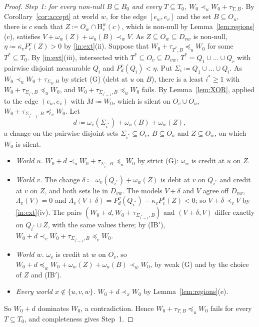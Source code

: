 \documentclass[11pt]{article}
\theoremstyle{definition}\newtheorem{definition}[theorem]{Definition}
\theoremstyle{remark}\newtheorem{remark}[theorem]{Remark}
\newcommand{\Hi}[3]{\mathrm H^{#1}_{#2}(#3)}
\begin{document}
\begin{proof}
\emph{Step 1: for every non-null $B\subseteq B_0$ and every $T\subseteq T_0$,
$W_0\prec_uW_0+\tau_{T,B}$.} By Corollary~\ref{cor:accept} at world $w$,
for the edge $[e_w,e_v]$ and the set $B\subseteq O_u$, there is $c$ such
that $Z\coloneqq O_w\cap\Hi wvc$, which is non-null by
Lemma~\ref{lem:regions}(c), satisfies
$V+\omega_w(Z)+\omega_u(B)\prec_wV$. As $Z\subseteq O_w\subseteq D_{vw}$ is
non-null, $\eta\coloneqq\kappa_vP^v_c(Z)>0$ by \ref{in:ext}(ii). Suppose
that $W_0+\tau_{T^*,B}\preceq_uW_0$ for some $T^*\subseteq T_0$. By
\ref{in:ext}(iii), intersected with $T^*\subseteq O_v\subseteq D_{vw}$,
$T^*=Q_1\cup\dots\cup Q_r$ with pairwise disjoint measurable $Q_i$ and
$P^v_d(Q_i)<\eta$. Put $\Sigma_i\coloneqq Q_1\cup\dots\cup Q_i$. As
$W_0\prec_uW_0+\tau_{\Sigma_0,B}$ by strict (G) (debt at $u$ on $B$), there
is a least $i^*\ge1$ with $W_0+\tau_{\Sigma_{i^*},B}\preceq_uW_0$, and
$W_0+\tau_{\Sigma_{i^*-1},B}\preceq_uW_0$ fails. By Lemma~\ref{lem:XOR},
applied to the edge $(e_u,e_v)$ with $M\coloneqq W_0$, which is silent on
$O_v\cup O_u$, $W_0+\tau_{\Sigma_{i^*-1},B}\preceq_vW_0$. Let
\[
 d\coloneqq\omega_v(\Sigma_{i^*})+\omega_u(B)+\omega_w(Z),
\]
a change on the pairwise disjoint sets $\Sigma_{i^*}\subseteq O_v$,
$B\subseteq O_u$ and $Z\subseteq O_w$, on which $W_0$ is silent.
\begin{itemize}[leftmargin=*,itemsep=2pt]
\item \emph{World $u$.} $W_0+d\prec_uW_0+\tau_{\Sigma_{i^*},B}\preceq_uW_0$
by strict (G): $\omega_w$ is credit at $u$ on $Z$.
\item \emph{World $v$.} The change $\delta\coloneqq\omega_v(Q_{i^*})+
\omega_w(Z)$ is debt at $v$ on $Q_{i^*}$ and credit at $v$ on $Z$, and both
sets lie in $D_{vw}$. The models $V+\delta$ and $V$ agree off $D_{vw}$,
$\Lambda_v(V)=0$ and
$\Lambda_v(V+\delta)=P^v_d(Q_{i^*})-\kappa_vP^v_c(Z)<0$; so
$V+\delta\prec_vV$ by \ref{in:ext}(iv). The pairs
$(W_0+d,W_0+\tau_{\Sigma_{i^*-1},B})$ and $(V+\delta,V)$ differ exactly on
$Q_{i^*}\cup Z$, with the same values there; by (IB$'$),
$W_0+d\prec_vW_0+\tau_{\Sigma_{i^*-1},B}\preceq_vW_0$.
\item \emph{World $w$.} $\omega_v$ is credit at $w$ on $O_v$, so
$W_0+d\preceq_wW_0+\omega_w(Z)+\omega_u(B)\prec_wW_0$, by weak (G) and by
the choice of $Z$ and (IB$'$).
\item \emph{Every world $x\notin\{u,v,w\}$.} $W_0+d\prec_xW_0$ by
Lemma~\ref{lem:regions}(e).
\end{itemize}
So $W_0+d$ dominates $W_0$, a contradiction. Hence
$W_0+\tau_{T,B}\preceq_uW_0$ fails for every $T\subseteq T_0$, and
completeness gives Step~1.


\end{proof}
\end{document}
